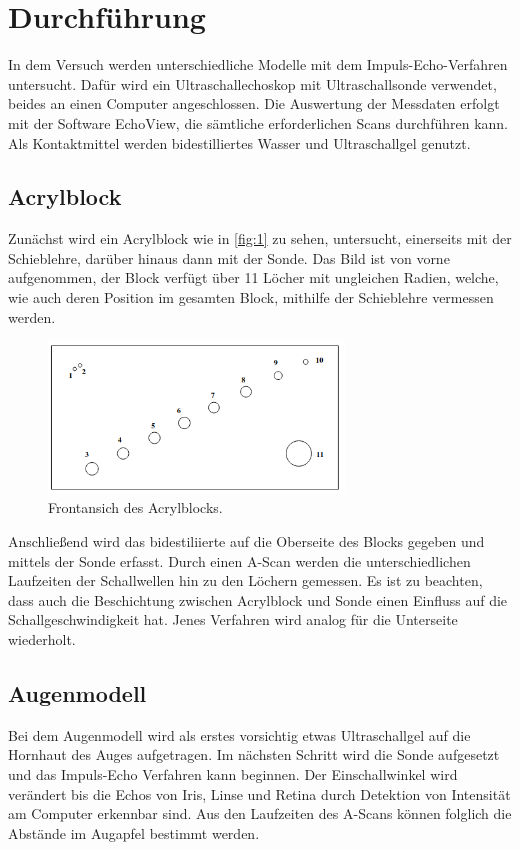 \section{Durchführung}
\label{sec:Durchführung}

In dem Versuch werden unterschiedliche Modelle mit dem Impuls-Echo-Verfahren 
untersucht. Dafür wird ein Ultraschallechoskop mit Ultraschallsonde verwendet, 
beides an einen Computer angeschlossen. Die Auswertung der Messdaten erfolgt
mit der Software EchoView, die sämtliche erforderlichen Scans durchführen kann.
Als Kontaktmittel werden bidestilliertes Wasser und Ultraschallgel genutzt.
\subsection{Acrylblock}
Zunächst wird ein Acrylblock wie in \autoref{fig:1} zu sehen, untersucht, 
einerseits mit der Schieblehre, darüber hinaus dann mit der Sonde. Das Bild 
ist von vorne aufgenommen, der Block verfügt über 11 Löcher mit ungleichen 
Radien, welche, wie auch deren Position im gesamten Block, mithilfe der 
Schieblehre vermessen werden.
\begin{figure}[H]
    \centering
        \centering
        \includegraphics[width=0.7\textwidth]{Bilder/acrylblock.png}
        \caption{Frontansich des Acrylblocks.\cite{anleitung7}}
        \label{fig:1}
    \hfill
\end{figure}
\noindent Anschließend wird das bidestiliierte auf die Oberseite des Blocks 
gegeben und mittels der Sonde erfasst. Durch einen A-Scan werden die 
unterschiedlichen Laufzeiten der Schallwellen hin zu den Löchern gemessen.
Es ist zu beachten, dass auch die Beschichtung zwischen Acrylblock und Sonde 
einen Einfluss auf die Schallgeschwindigkeit hat. Jenes Verfahren wird analog 
für die Unterseite wiederholt.

\subsection{Augenmodell}
Bei dem Augenmodell wird als erstes vorsichtig etwas Ultraschallgel auf die 
Hornhaut des Auges aufgetragen. Im nächsten Schritt wird die Sonde aufgesetzt 
und das Impuls-Echo Verfahren kann beginnen. Der Einschallwinkel wird verändert 
bis die Echos von Iris, Linse und Retina durch Detektion von Intensität am 
Computer erkennbar sind. Aus den Laufzeiten des A-Scans können folglich die 
Abstände im Augapfel bestimmt werden.

